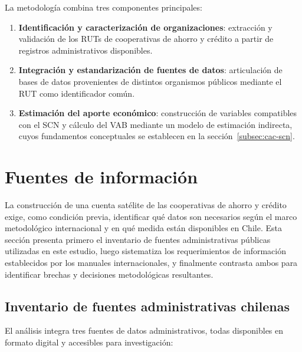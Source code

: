 La metodología combina tres componentes principales:

\begin{enumerate}
    \item[a)] \textbf{Identificación y caracterización de organizaciones}: 
    extracción y validación de los RUTs de cooperativas de ahorro y crédito 
    a partir de registros administrativos disponibles.
    \item[b)] \textbf{Integración y estandarización de fuentes de datos}: 
    articulación de bases de datos provenientes de distintos organismos 
    públicos mediante el RUT como identificador común.
    \item[c)] \textbf{Estimación del aporte económico}: construcción de 
    variables compatibles con el SCN y cálculo del VAB mediante un modelo 
    de estimación indirecta, cuyos fundamentos conceptuales se establecen 
    en la sección~\ref{subsec:cac-scn}.
\end{enumerate}


\section{Fuentes de información}
\label{sec:fuentes-informacion}

La construcción de una cuenta satélite de las cooperativas de ahorro y crédito exige, como condición previa, identificar qué datos son necesarios según el marco metodológico internacional y en qué medida están disponibles en Chile. Esta sección presenta primero el inventario de fuentes administrativas públicas utilizadas en este estudio, luego sistematiza los requerimientos de información establecidos por los manuales internacionales, y finalmente contrasta ambos para identificar brechas y decisiones metodológicas resultantes.

\subsection{Inventario de fuentes administrativas chilenas}
\label{subsec:inventario-fuentes}
El análisis integra tres fuentes de datos administrativos, todas disponibles en 
formato digital y accesibles para investigación:

